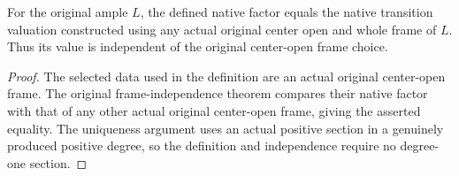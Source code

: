 \begin{theorem}\label{thm:native-tc-intrinsic-factor-original-frame-independence}
\leanok
{}
For the original ample $L$, the defined native factor equals
the native transition valuation constructed using any actual
original center open and whole frame of $L$. Thus its value is
independent of the original center-open frame choice.
\end{theorem}
\begin{proof}
The selected data used in the definition are an actual
original center-open frame. The original frame-independence
theorem compares their native factor with that of any other
actual original center-open frame, giving the asserted
equality. The uniqueness argument uses an actual positive
section in a genuinely produced positive degree, so the
definition and independence require no degree-one section.
\end{proof}
